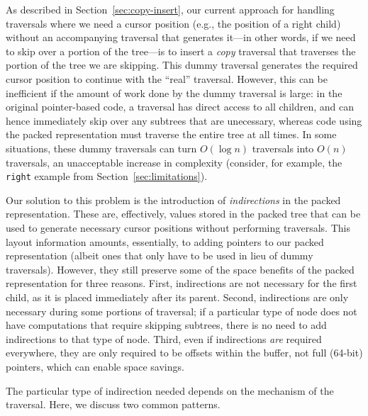 \documentclass[a4paper,english]{lipics-v2016}
\begin{document}
As described in Section~\ref{sec:copy-insert}, our current approach for
handling traversals where we need a cursor position (e.g., the position of a
right child) without an accompanying traversal that generates it---in other
words, if we need to skip over a portion of the tree---is to insert a {\em
copy} traversal that traverses the portion of the tree we are skipping. This
dummy traversal generates the required cursor position to continue with the
``real'' traversal. However, this can be inefficient if the amount of work
done by the dummy traversal is large: in the original pointer-based code, a
traversal has direct access to all children, and can hence immediately skip
over any subtrees that are unecessary, whereas code using the packed
representation must traverse the entire tree at all times. In some situations,
these dummy traversals can turn $O(\log n)$ traversals into $O(n)$ traversals,
an unacceptable increase in complexity (consider, for example, the {\tt right} example from Section~\ref{sec:limitations}).


Our solution to this problem is the introduction of {\em indirections} in the
packed representation. These are, effectively, values stored in the packed
tree that can be used to generate necessary cursor positions without
performing traversals. This layout information amounts, essentially, to adding
pointers to our packed representation (albeit ones that only have to be used
in lieu of dummy traversals). However, they still preserve some of the space
benefits of the packed representation for three reasons. First, indirections
are not necessary for the first child, as it is placed immediately after its
parent. Second, indirections are
only necessary during some portions of traversal; if a particular type of node
does not have computations that require skipping subtrees, there is no need to
add indirections to that type of node. Third, even if indirections {\em are}
required everywhere, they are only required to be offsets within the buffer,
not full (64-bit) pointers, which can enable space savings.

The particular type of indirection needed depends on the mechanism of the
traversal. Here,
we discuss two common patterns.
\end{document}
